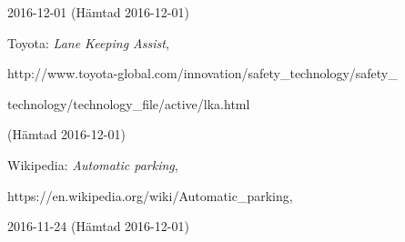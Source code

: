 \documentclass[a4paper]{IEEEtran}
\begin{document}
\begin{thebibliography}{77}
	2016-12-01 (Hämtad 2016-12-01)
	
	Toyota: \emph{Lane Keeping Assist}, 
	
	http://www.toyota-global.com/innovation/safety\_technology/safety\_
	
	technology/technology\_file/active/lka.html 
	
	(Hämtad 2016-12-01)
	
	Wikipedia: \emph{Automatic parking}, 
	
	https://en.wikipedia.org/wiki/Automatic\_parking, 
	
	2016-11-24 (Hämtad 2016-12-01)
\end{thebibliography}
\end{document}
